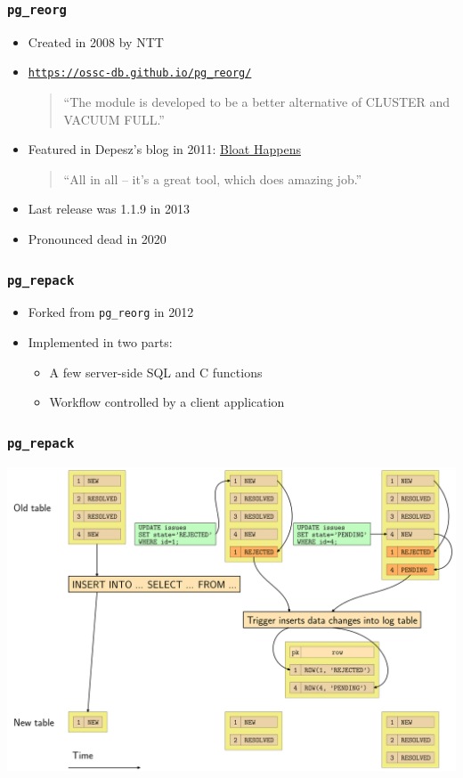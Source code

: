 \begin{frame}
  \frametitle{\texttt{pg\_reorg}}
  \begin{itemize}
    \item Created in 2008 by NTT
    \item \href{https://ossc-db.github.io/pg_reorg/pg_reorg.html}{\texttt{https://ossc-db.github.io/pg\_reorg/}}
      \begin{quote}
	``The module is developed to be a better alternative of CLUSTER and VACUUM FULL.''
      \end{quote}
    \item Featured in Depesz's blog in 2011: \href{https://www.depesz.com/2011/07/06/bloat-happens/}{Bloat Happens}
      \begin{quote}
	``All in all – it's a great tool, which does amazing job.''
      \end{quote}
    \item Last release was 1.1.9 in 2013
    \item Pronounced dead in 2020
  \end{itemize}
\end{frame}

\begin{frame}
  \frametitle{\texttt{pg\_repack}}
  \begin{itemize}
    \item Forked from \texttt{pg\_reorg} in 2012
    \item Implemented in two parts:
      \begin{itemize}
	\item A few server-side SQL and C functions
	\item Workflow controlled by a client application
      \end{itemize}
  \end{itemize}
\end{frame}

\begin{frame}
  \frametitle{\texttt{pg\_repack}}
  \begin{center}
    \includegraphics[height=\sizeforimages\textheight]{images/pg_repack_01.png}
  \end{center}
\end{frame}

